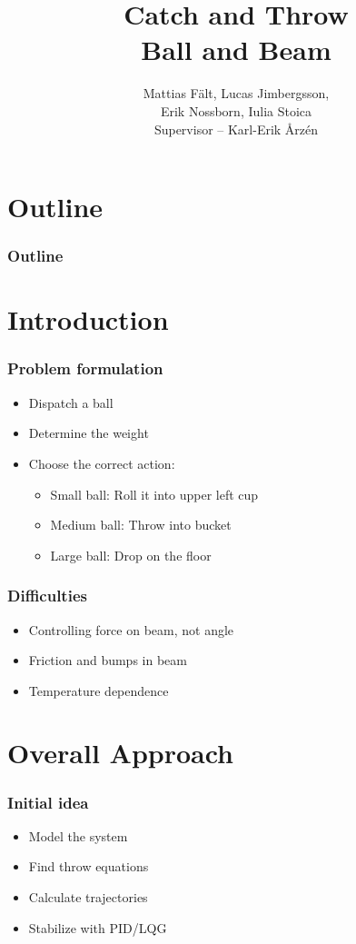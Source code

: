 \documentclass[
compress]
{beamer}
\title[Catch and Throw]{Catch and Throw\\Ball and Beam}
\author[]{Mattias Fält, Lucas Jimbergsson,\\Erik Nossborn, Iulia Stoica\\\vspace{1em}Supervisor -- Karl-Erik Årz\'{e}n}
\begin{document}
\frame{\titlepage}

\section*{Outline}

\frame
{
  \frametitle{Outline}
  \tableofcontents%
}

\section{Introduction}
\frame{\sectionpage}
\begin{frame}
\frametitle{Problem formulation}
\begin{itemize}
\item Dispatch a ball
\item Determine the weight
\item Choose the correct action:
\begin{itemize}
\item Small ball: Roll it into upper left cup
\item Medium ball: Throw into bucket
\item Large ball: Drop on the floor
\end{itemize}
\end{itemize}
\end{frame}


\begin{frame}
\frametitle{Difficulties}
\begin{itemize}
\item Controlling force on beam, not angle
\item Friction and bumps in beam
\item Temperature dependence
\end{itemize}
\end{frame}

\section{Overall Approach}
\frame{\sectionpage}
\begin{frame}
\frametitle{Initial idea}
\begin{itemize}
\item Model the system
\item Find throw equations
\item Calculate trajectories
\item Stabilize with PID/LQG
\end{itemize}
\end{frame}
\end{document}
